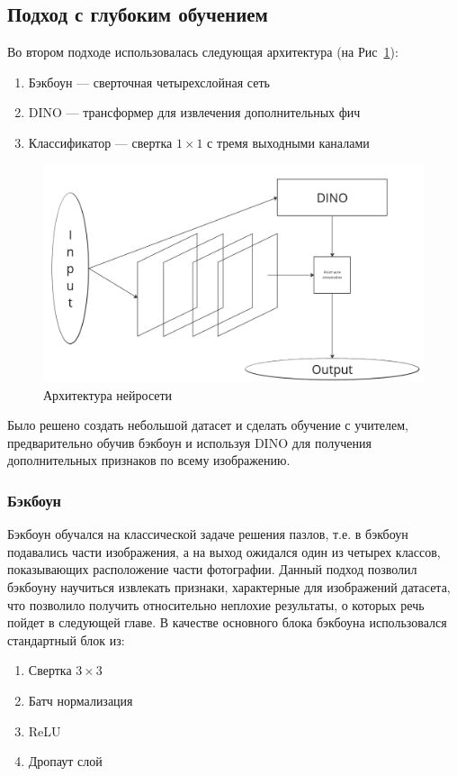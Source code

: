 \subsection{Подход с глубоким обучением}
Во втором подходе использовалась следующая архитектура (на Рис~\ref{nn_architecure}):
\begin{enumerate}
    \item Бэкбоун --- сверточная четырехслойная сеть
    \item DINO --- трансформер для извлечения дополнительных фич
    \item Классификатор --- свертка $1\times 1$ с тремя выходными каналами
\end{enumerate}
\begin{figure}[h]
    \begin{center}
        \includegraphics[scale=0.4]{src/Design/assets/NN_architecure.png}
    \end{center}
    \caption{Архитектура нейросети}\label{nn_architecure}
\end{figure}
Было решено создать небольшой датасет и сделать обучение с учителем, предварительно обучив бэкбоун и используя DINO для получения дополнительных признаков 
по всему изображению.
\subsubsection{Бэкбоун}
Бэкбоун обучался на классической задаче решения пазлов, т.е. в бэкбоун подавались части изображения, а на выход ожидался один из четырех классов, 
показывающих расположение части фотографии. Данный подход позволил бэкбоуну научиться извлекать признаки, характерные для изображений датасета, что позволило получить 
относительно неплохие результаты, о которых речь пойдет в следующей главе. В качестве основного блока бэкбоуна использовался стандартный блок из:
\begin{enumerate}
    \item Свертка $3\times 3$
    \item Батч нормализация
    \item ReLU
    \item Дропаут слой
\end{enumerate}

